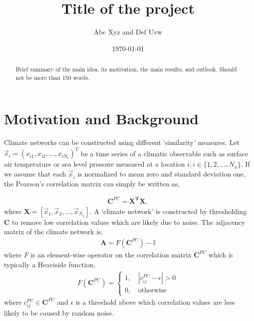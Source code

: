 
\usepackage{lipsum}
\title{Title of the project}
\author{Abc Xyz and Def Uvw}
\date{\today{}}

\maketitle


\begin{abstract}
Brief summary of the main idea, its motivation, the main results, and outlook. Should not be more than 150 words. \lipsum[2-2]
\end{abstract}


\section{Motivation and Background}
\label{sec:motivation_background}

\lipsum[2-2]

Climate networks can be constructed using different `similarity'
measures. Let \(\vec{x}_i = (x_{i1}, x_{i2}, \dots, x_{iN_t})^T\) be a
time series of a climatic observable such as surface air temperature or
sea level pressure measured at a location
\(i; i \in \{1, 2, \dots, N_x\}\). If we assume that each \(\vec{x}_i\)
is normalized to mean zero and standard deviation one, the Pearson's
correlation matrix can simply be written as,

\begin{eqnarray}
\mathbf{C}^{PC} = \mathbf{X^T} \mathbf{X},
\label{eq:corrmat}
\end{eqnarray}
where
\(\mathbf{X} = [ \vec{x}_1, \vec{x}_2, \dots, \vec{x}_{N_x} ]\). A
`climate network' is constructed by thresholding \(\mathbf{C}\) to
remove low correlation values which are likely due to noise. The
adjacency matrix of the climate network is, 
\begin{eqnarray}
\mathbf{A} = F(\mathbf{C}^{PC}) - \mathbb{I}
\label{eq:adjmat}
\end{eqnarray}
where \(F\) is an element-wise operator on the correlation matrix
\(\mathbf{C}^{PC}\) which is typically a Heaviside function, 
\begin{eqnarray}
F(\mathbf{C}^{PC}) = 
\begin{cases}
1, \quad |c^{PC}_{ij} - \epsilon | > 0\\
0, \quad \textrm{otherwise}
\end{cases}
\label{eq:heaviside}
\end{eqnarray}
where \(c_{ij}^{PC} \in \mathbf{C}^{PC}\) and \(\epsilon\) is a
threshold above which correlation values are less likely to be caused by
random noise.


